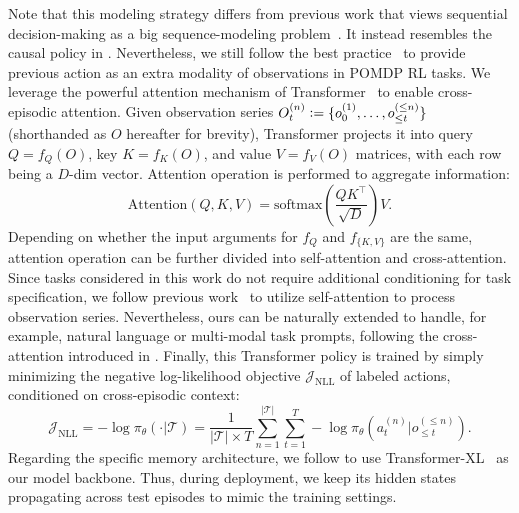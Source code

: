 \documentclass{article}
\begin{document}
Note that this modeling strategy differs from previous work that views sequential decision-making as a big sequence-modeling problem~\citep{chen2021decisiontransformer,janner2021onebigsequence,laskin2023incontext,jiang2022vima}. It instead resembles the causal policy in \citet{openai2022vpt}. Nevertheless, we still follow the best practice~\citep{for-the-win,openai2019dota,fan2022minedojo} to provide previous action as an extra modality of observations in POMDP RL tasks.
We leverage the powerful attention mechanism of Transformer~\citep{vaswani2017attention} to enable cross-episodic attention.
Given observation series $O_t^{(n)} \vcentcolon= \{o_{0}^{(1)},\ldots, o_{\leq t}^{(\leq n)} \}$ (shorthanded as $O$ hereafter for brevity),
Transformer projects it into query $Q = f_Q(O)$, key $K = f_K (O)$, and value $V = f_V(O)$ matrices, with each row being a $D$-dim vector.
Attention operation is performed to aggregate information:
\begin{equation}
    \text{Attention}(Q, K, V) = \text{softmax}(\frac{QK^\intercal}{\sqrt{D}})V.
\end{equation}
Depending on whether the input arguments for $f_Q$ and $f_{\{K, V\}}$ are the same, attention operation can be further divided into self-attention and cross-attention.
Since tasks considered in this work do not require additional conditioning for task specification,
we follow previous work~\citep{openai2022vpt,zhu2022viola} to utilize self-attention to process observation series.
Nevertheless, ours can be naturally extended to handle, for example, natural language or multi-modal task prompts, following the cross-attention introduced in \citet{jiang2022vima}.
Finally, this Transformer policy is trained by simply minimizing the negative log-likelihood objective $\mathcal{J}_{\text{NLL}}$ of labeled actions, conditioned on cross-episodic context:
\begin{equation}
    \mathcal{J}_{\text{NLL}} =   - \log \pi_\theta (\cdot \vert \mathcal{T}) = \frac{1}{\vert \mathcal{T} \vert \times T} \sum_{n = 1}^{\vert \mathcal{T} \vert} \sum_{t = 1}^T - \log \pi_\theta \left(a_t^{(n)} \vert  o_{\leq t}^{(\leq n)} \right).
\end{equation}
Regarding the specific memory architecture, we follow \citet{openai2022vpt,team2023humantimescale} to use Transformer-XL~\citep{dai2019transformerxl} as our model backbone. Thus, during deployment, we keep its hidden states propagating across test episodes to mimic the training settings.
\end{document}
